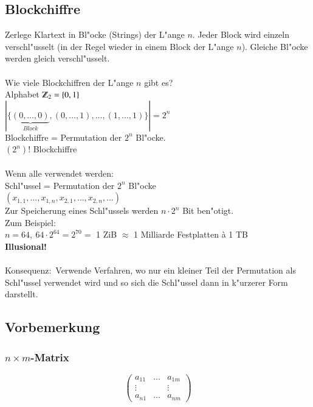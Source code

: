 \subsection{Blockchiffre}
Zerlege Klartext in Bl"ocke (Strings) der L"ange $n$.  Jeder Block wird einzeln verschl"usselt (in der Regel wieder in einem Block der L"ange $n$). Gleiche Bl"ocke werden gleich verschl"usselt.\\
\\
Wie viele Blockchiffren der L"ange $n$ gibt es?\\
Alphabet $\Z_2=\{0,1\}$\\
$|\{\underbrace{(0,\ldots,0)}_{Block},(0,\ldots,1),\ldots,(1,\ldots,1)\}| = 2^n$\\
Blockchiffre = Permutation der $2^n$ Bl"ocke.\\
$(2^n)!$ Blockchiffre\\
\\
Wenn alle verwendet werden:\\
Schl"ussel = Permutation der $2^n$ Bl"ocke\\
$(x_{1,1},\ldots,x_{1,n},x_{2,1},\ldots,x_{2,n},\ldots)$ \ \ \\
Zur Speicherung eines Schl"ussels werden $n \cdot 2^n$ Bit ben"otigt.\\
Zum Beispiel:\\
$n=64, \ 64 \cdot 2^{64}=2^{70} =$ 1 ZiB $\approx$ 1 Milliarde Festplatten \`a 1 TB\\
\textbf{Illusional!}\\
\\
Konsequenz:\ Verwende Verfahren, wo nur ein kleiner Teil der Permutation als Schl"ussel verwendet wird und so sich die Schl"ussel dann in k"urzerer Form darstellt.
%
%

\subsection{Vorbemerkung}

\subsubsection{$n\times m$-Matrix}

\[
	\begin{pmatrix}
		a_{11} & \ldots & a_{1m} \\
		\vdots &  & \vdots \\
		a_{n1} & \ldots & a_{nm}
	\end{pmatrix}
\]

